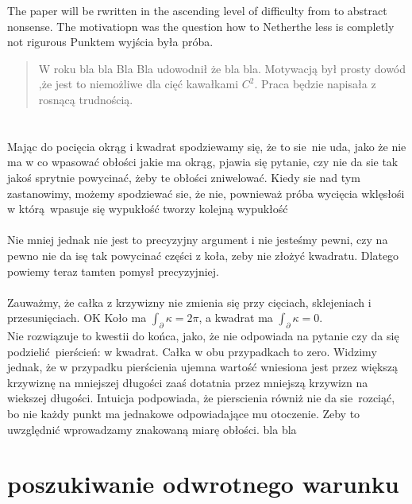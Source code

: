 \documentclass[a4paper, 12pt]{article}
\begin{document}
The paper will be rwritten in the ascending level of difficulty from to abstract
nonsense.
The motivatiopn was the question how to
Netherthe less is completly not rigurous
Punktem wyjścia była próba.



\begin{abstract}
W roku bla bla Bla Bla udowodnił że bla bla. Motywacją był prosty dowód ,że jest to niemożliwe dla cięć
kawałkami $C^2$. Praca będzie napisała z rosnącą trudnością.
\end{abstract}
\section{}
Mając do pocięcia okrąg i kwadrat spodziewamy się, że to sie nie uda, jako że nie ma w co wpasować
obłości jakie ma okrąg, pjawia się pytanie, czy nie da sie tak jakoś sprytnie powycinać, żeby te obłości
zniwelować. Kiedy sie nad tym zastanowimy, możemy spodziewać sie, że nie, pownieważ próba wycięcia wklęsłośi
w którą wpasuje się wypukłość tworzy kolejną wypukłość \\
 \\
Nie mniej jednak nie jest to precyzyjny argument i nie jesteśmy pewni, czy na pewno nie da isę tak powycinać
części z koła, zeby nie złożyć kwadratu.
Dlatego powiemy teraz tamten pomysł precyzyjniej. \\
 \\
Zauważmy, że całka z krzywizny nie zmienia się przy cięciach, sklejeniach i przesunięciach.
OK
Koło ma $\displaystyle\int_{\partial} \kappa = 2 \pi$, a kwadrat ma $\displaystyle\int  _{\partial} \kappa
= 0$. \\
Nie rozwiązuje to kwestii do końca, jako, że nie odpowiada na pytanie czy da się podzielić pierścień:
w kwadrat. Całka w obu przypadkach to zero. Widzimy jednak, że w przypadku pierścienia ujemna wartość
wniesiona jest przez większą krzywiznę na mniejszej długości zaaś dotatnia przez mniejszą krzywizn na
wiekszej długości. Intuicja podpowiada, że pierscienia równiż nie da sie rozciąć, bo nie każdy punkt ma
jednakowe odpowiadające mu otoczenie. Zeby to uwzględnić wprowadzamy znakowaną miarę obłości.
bla bla
\section{poszukiwanie odwrotnego warunku}
\end{document}
